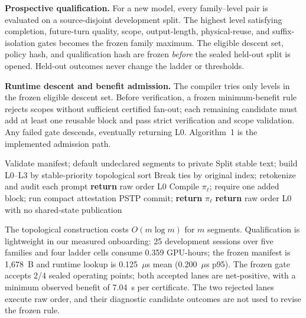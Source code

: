 \documentclass[journal]{IEEEtran}
\begin{document}
\smallskip
\noindent\textbf{Prospective qualification.}
For a new model, every family--level pair is evaluated on a source-disjoint development split. The highest level satisfying completion, future-turn quality, scope, output-length, physical-reuse, and suffix-isolation gates becomes the frozen family maximum. The eligible descent set, policy hash, and qualification hash are frozen \emph{before} the sealed held-out split is opened. Held-out outcomes never change the ladder or thresholds.

\smallskip
\noindent\textbf{Runtime descent and benefit admission.}
The compiler tries only levels in the frozen eligible descent set. Before verification, a frozen minimum-benefit rule rejects scopes without sufficient certified fan-out; each remaining candidate must add at least one reusable block and pass strict verification and scope validation. Any failed gate descends, eventually returning L0. Algorithm~1 is the implemented admission path.

\begin{algorithm}[t]
\scriptsize
\begin{algorithmic}[1]
\STATE Validate manifest; default undeclared segments to private
\STATE Split stable text; build L0--L3 by stable-priority topological sort
\STATE Break ties by original index; retokenize and audit each prompt
  \STATE \textbf{return} raw order L0
\ENDIF
{}
  \STATE Compile $\pi_\ell$; require one added block; run compact attestation
    \STATE PSTP commit; \textbf{return} $\pi_\ell$
  \ENDIF
\ENDFOR
\STATE \textbf{return} raw order L0 with no shared-state publication
\end{algorithmic}
\caption{Frozen certificate-guided layout descent.}
\label{alg:descent}
\end{algorithm}

The topological construction costs $O(m\log m)$ for $m$ segments. Qualification is lightweight in our measured onboarding: 25 development sessions over five families and four ladder cells consume 0.359 GPU-hours; the frozen manifest is 1{,}678~B and runtime lookup is 0.125~$\mu$s mean (0.200~$\mu$s p95). The frozen gate accepts 2/4 sealed operating points; both accepted lanes are net-positive, with a minimum observed benefit of 7.04~s per certificate. The two rejected lanes execute raw order, and their diagnostic candidate outcomes are not used to revise the frozen rule.
\end{document}

